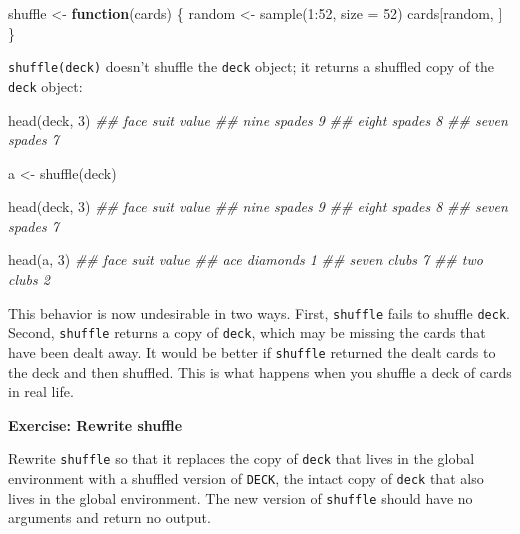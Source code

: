 \documentclass[
  letterpaper,
  DIV=11,
  numbers=noendperiod]{scrbook}
\newenvironment{Shaded}{\begin{snugshade}}{\end{snugshade}}
\newcommand{\AttributeTok}[1]{\textcolor[rgb]{0.40,0.45,0.13}{#1}}
\newcommand{\ControlFlowTok}[1]{\textcolor[rgb]{0.00,0.23,0.31}{\textbf{#1}}}
\newcommand{\DecValTok}[1]{\textcolor[rgb]{0.68,0.00,0.00}{#1}}
\newcommand{\DocumentationTok}[1]{\textcolor[rgb]{0.37,0.37,0.37}{\textit{#1}}}
\newcommand{\FunctionTok}[1]{\textcolor[rgb]{0.28,0.35,0.67}{#1}}
\newcommand{\NormalTok}[1]{\textcolor[rgb]{0.00,0.23,0.31}{#1}}
\newcommand{\OtherTok}[1]{\textcolor[rgb]{0.00,0.23,0.31}{#1}}
\newcommand{\SpecialCharTok}[1]{\textcolor[rgb]{0.37,0.37,0.37}{#1}}
\begin{document}
\begin{Shaded}
\begin{Highlighting}[]
\NormalTok{shuffle }\OtherTok{\textless{}{-}} \ControlFlowTok{function}\NormalTok{(cards) \{ }
\NormalTok{  random }\OtherTok{\textless{}{-}} \FunctionTok{sample}\NormalTok{(}\DecValTok{1}\SpecialCharTok{:}\DecValTok{52}\NormalTok{, }\AttributeTok{size =} \DecValTok{52}\NormalTok{)}
\NormalTok{  cards[random, ]}
\NormalTok{\}}
\end{Highlighting}
\end{Shaded}

\texttt{shuffle(deck)} doesn't shuffle the \texttt{deck} object; it
returns a shuffled copy of the \texttt{deck} object:

\begin{Shaded}
\begin{Highlighting}[]
\FunctionTok{head}\NormalTok{(deck, }\DecValTok{3}\NormalTok{)}
\DocumentationTok{\#\#  face   suit value}
\DocumentationTok{\#\#  nine spades     9}
\DocumentationTok{\#\# eight spades     8}
\DocumentationTok{\#\# seven spades     7}

\NormalTok{a }\OtherTok{\textless{}{-}} \FunctionTok{shuffle}\NormalTok{(deck)}

\FunctionTok{head}\NormalTok{(deck, }\DecValTok{3}\NormalTok{)}
\DocumentationTok{\#\#  face   suit value}
\DocumentationTok{\#\#  nine spades     9}
\DocumentationTok{\#\# eight spades     8}
\DocumentationTok{\#\# seven spades     7}

\FunctionTok{head}\NormalTok{(a, }\DecValTok{3}\NormalTok{)}
\DocumentationTok{\#\#  face     suit value}
\DocumentationTok{\#\#   ace diamonds     1}
\DocumentationTok{\#\# seven    clubs     7}
\DocumentationTok{\#\#   two    clubs     2}
\end{Highlighting}
\end{Shaded}

This behavior is now undesirable in two ways. First, \texttt{shuffle}
fails to shuffle \texttt{deck}. Second, \texttt{shuffle} returns a copy
of \texttt{deck}, which may be missing the cards that have been dealt
away. It would be better if \texttt{shuffle} returned the dealt cards to
the deck and then shuffled. This is what happens when you shuffle a deck
of cards in real life.

\begin{tcolorbox}[enhanced jigsaw, left=2mm, breakable, colback=white, colframe=quarto-callout-color-frame, leftrule=.75mm, bottomrule=.15mm, arc=.35mm, opacityback=0, rightrule=.15mm, toprule=.15mm]

\vspace{-3mm}\textbf{Exercise: Rewrite shuffle}\vspace{3mm}

Rewrite \texttt{shuffle} so that it replaces the copy of \texttt{deck}
that lives in the global environment with a shuffled version of
\texttt{DECK}, the intact copy of \texttt{deck} that also lives in the
global environment. The new version of \texttt{shuffle} should have no
arguments and return no output.

\end{tcolorbox}
\end{document}

